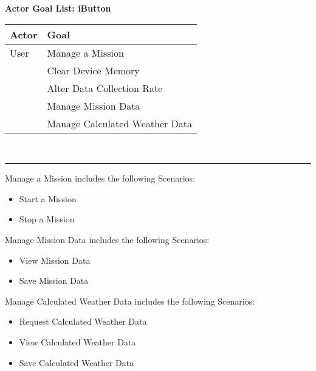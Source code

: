 \documentclass[letterpaper]{article}
\begin{document}
\noindent
\begin{center}
\textbf{Actor Goal List:  iButton}
\end{center}
\begin{center}
\begin{tabular}{|l|l|}\hline
\textbf{Actor} & \textbf{Goal}\\\hline
 User & Manage a Mission\\\hline
 & Clear Device Memory\\\hline
 & Alter Data Collection Rate\\\hline
 & Manage Mission Data\\\hline
 & Manage Calculated Weather Data\\\hline
\end{tabular}\\
\end{center}
\hrule \vspace{4 ex}
Manage a Mission includes the following Scenarios:
\begin{itemize}
\item Start a Mission
\item Stop a Mission
\end{itemize}
\vspace{4 ex}
Manage Mission Data includes the following Scenarios:
\begin{itemize}
\item View Mission Data
\item Save Mission Data
\end{itemize}
\vspace{4 ex}
Manage Calculated Weather Data includes the following Scenarios:
\begin{itemize}
\item Request Calculated Weather Data
\item View Calculated Weather Data
\item Save Calculated Weather Data
\end{itemize}
\end{document}
